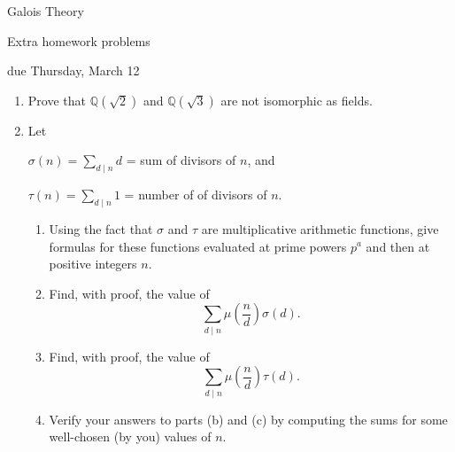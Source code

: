 \documentclass[11pt]{report}
\newcommand\QQ{\mathbb Q}
\begin{document}
\thispagestyle{empty}

\begin{center}
{\sc Galois Theory

\smallskip

Extra homework problems

\smallskip

due Thursday, March 12}

\end{center}

\bigskip

\begin{enumerate}

\item  Prove that $\QQ(\sqrt{2})$ and $\QQ(\sqrt{3})$ are not isomorphic as fields.
            
\item Let 

\centerline{$\sigma(n) = \sum_{d \mid n} d$ = sum of divisors  of $n$, \; and}

\centerline{$\tau(n) = \sum_{d \mid n} 1$ = number of of divisors  of $n$.}

\begin{enumerate}

\item Using the fact that $\sigma$ and $\tau$ are multiplicative arithmetic functions,
give formulas for these functions evaluated at prime powers $p^a$ and then at positive
integers $n$.

\item Find, with proof, the value of
$$
\sum_{d \mid n} \mu\left(\frac{n}{d}\right) \sigma(d).
$$

\item Find, with proof, the value of
$$
\sum_{d \mid n} \mu\left(\frac{n}{d}\right) \tau(d).
$$

\item Verify your answers to parts (b) and (c) by computing the sums for some well-chosen (by you)
values of $n$.

\end{enumerate}
\end{enumerate}
\end{document}
